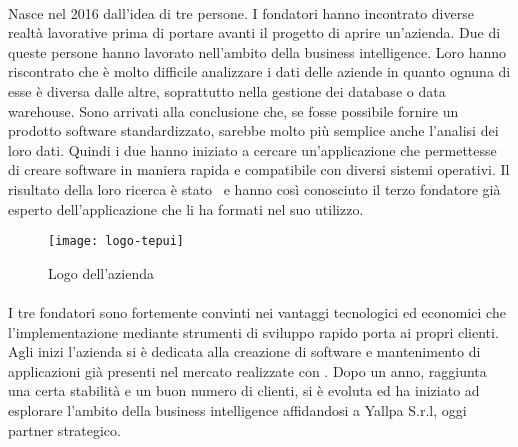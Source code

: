 \paragraph*{}Nasce nel 2016 dall'idea di tre persone. I fondatori hanno incontrato diverse realtà lavorative prima di portare avanti il progetto di aprire un'azienda. Due di queste persone hanno lavorato nell'ambito della business intelligence. Loro hanno riscontrato che è molto difficile analizzare i dati delle aziende in quanto ognuna di esse è diversa dalle altre, soprattutto nella gestione dei database o data warehouse. Sono arrivati alla conclusione che, se fosse possibile fornire un prodotto software standardizzato, sarebbe molto più semplice anche l'analisi dei loro dati. Quindi i due hanno iniziato a cercare un'applicazione che permettesse di creare software in maniera rapida e compatibile con diversi sistemi operativi. Il risultato della loro ricerca è stato \inde\ e hanno così conosciuto il terzo fondatore già esperto dell'applicazione che li ha formati nel suo utilizzo.

\begin{figure}[!h] 
	\centering 
	\texttt{[image: logo-tepui]} 
	\caption{Logo dell'azienda}
\end{figure}

 
\paragraph*{}I tre fondatori sono fortemente convinti nei vantaggi tecnologici ed economici che l'implementazione mediante strumenti di sviluppo rapido porta ai propri clienti. Agli inizi l'azienda si è dedicata alla creazione di software e mantenimento di applicazioni già presenti nel mercato realizzate con \inde. Dopo un anno, raggiunta una certa stabilità e un buon numero di clienti, si è evoluta ed ha iniziato ad esplorare l'ambito della business intelligence affidandosi a Yallpa S.r.l, oggi partner strategico. 

 

